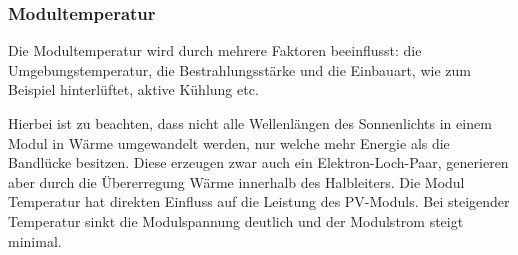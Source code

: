 \subsubsection{Modultemperatur}
Die Modultemperatur wird durch mehrere Faktoren beeinflusst: die Umgebungstemperatur, die Bestrahlungsstärke und
die Einbauart, wie zum Beispiel hinterlüftet, aktive Kühlung etc.

Hierbei ist zu beachten, dass nicht alle Wellenlängen des Sonnenlichts in einem Modul in Wärme umgewandelt werden, nur welche mehr Energie als die Bandlücke besitzen.
Diese erzeugen zwar auch ein Elektron-Loch-Paar, generieren aber durch die Übererregung Wärme innerhalb des Halbleiters.
Die Modul Temperatur hat direkten Einfluss auf die Leistung des PV-Moduls.
Bei steigender Temperatur sinkt die Modulspannung deutlich und der Modulstrom steigt minimal.
